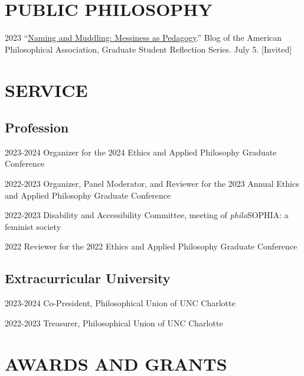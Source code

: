 \documentclass{article}
\begin{document}
\section*{\normalsize{PUBLIC PHILOSOPHY}}
\begin{tablist}
    \item[2023] \tab{}\enquote{\href{https://blog.apaonline.org/2023/07/05/naming-and-muddling-messiness-as-pedagogy/}{Naming and Muddling: Messiness as Pedagogy}.} Blog of the American Philosophical Association, Graduate Student Reflection Series. July 5. [Invited]
\end{tablist}

\section*{\normalsize{SERVICE}}
\subsection*{\normalsize{Profession}}
\begin{tablist}
    \item[2023-2024] \tab{}Organizer for the 2024 Ethics and Applied Philosophy Graduate Conference
    \item[2022-2023] \tab{}Organizer, Panel Moderator, and Reviewer for the 2023 Annual Ethics and Applied Philosophy Graduate Conference
    \item[2022-2023] \tab{}Disability and Accessibility Committee,  meeting of \textit{philo}SOPHIA: a feminist society 
    \item[2022] \tab{}Reviewer for the 2022 Ethics and Applied Philosophy Graduate Conference
\end{tablist}
\subsection*{\normalsize{Extracurricular University}}
\begin{tablist}
    \item[2023-2024] \tab{}Co-President, Philosophical Union of UNC Charlotte
    \item[2022-2023] \tab{}Treasurer, Philosophical Union of UNC Charlotte
\end{tablist}

\section*{\normalsize{AWARDS AND GRANTS}}
\end{document}
